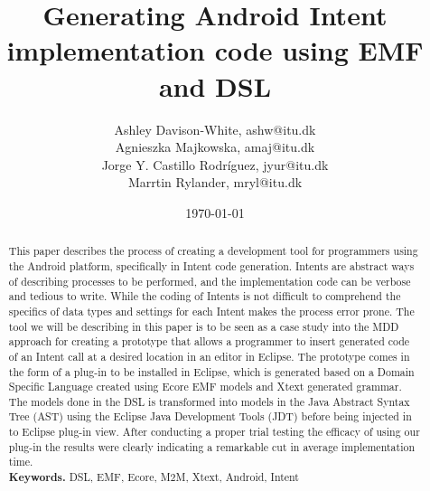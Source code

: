\documentclass{llncs}
\title{Generating Android Intent implementation code using EMF and DSL}
\author{Ashley Davison-White, ashw@itu.dk 
      \\Agnieszka Majkowska, amaj@itu.dk
      \\Jorge Y. Castillo Rodríguez, jyur@itu.dk
      \\Marrtin Rylander, mryl@itu.dk}
\institute{IT University of Copenhagen}
\date{\today}
\begin{document}
\maketitle
\thispagestyle{plain}
\pagestyle{headings}
\setcounter{page}{1}

 \begin{abstract}
 This paper describes the process of creating a development tool for programmers using the Android platform, specifically in Intent code generation.
Intents are abstract ways of describing processes to be performed, and the implementation code can be verbose and tedious to write. While the coding of Intents is not difficult to comprehend the specifics of data types and settings for each Intent makes the process error prone. The tool we will be describing in this paper is to be seen as a case study into the MDD approach for creating a prototype that allows a programmer to insert generated code of an Intent call at a desired location in an editor in Eclipse. The prototype comes in the form of a plug-in to be installed in Eclipse, which is generated based on a Domain Specific Language created using Ecore EMF models and Xtext generated grammar.
 The models done in the DSL is transformed into models in the Java Abstract Syntax Tree (AST) using the Eclipse Java Development Tools (JDT) before being injected in to Eclipse plug-in view.
 After conducting a proper trial testing the efficacy of using our plug-in the results were clearly indicating a remarkable cut in average implementation time.   
\\[1\baselineskip]
\textbf{Keywords.} DSL, EMF, Ecore, M2M, Xtext, Android, Intent
 \end{abstract}



















\renewcommand{\bibname}{References}
\setlength{\bibsep}{0.0pt}


\end{document}
